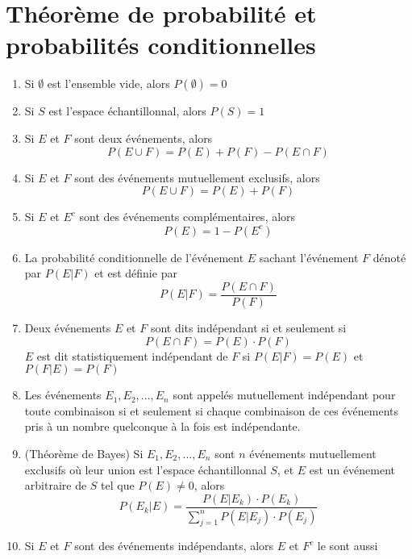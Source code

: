\section[Chapitre 2-3]{Théorème de probabilité et probabilités conditionnelles}
\begin{enumerate}
	\item Si $\emptyset$ est l'ensemble vide, alors $P(\emptyset)=0$
	\item Si $S$ est l'espace échantillonnal, alors $P(S)=1$
	\item Si $E$ et $F$ sont deux événements, alors
	\[P(E\cup F) = P(E) + P(F) - P(E\cap F)\]
	\item Si $E$ et $F$ sont des événements mutuellement exclusifs, alors
	\[P(E\cup F) = P(E) + P(F)\]
	\item Si $E$ et $E^c$ sont des événements complémentaires, alors
	\[P(E) = 1 - P(E^c)\]
	\item La probabilité conditionnelle de l'événement $E$ sachant l'événement $F$ dénoté par $P(E|F)$ et est définie par
	\[P(E|F)=\frac{P(E\cap F)}{P(F)}\]
	\item Deux événements $E$ et $F$ sont dits indépendant si et seulement si
	\[P(E\cap F)=P(E)\cdot P(F)\]
	$E$ est dit statistiquement indépendant de $F$ si $P(E|F)=P(E)$ et $P(F|E)=P(F)$
	\item Les événements $E_1,E_2,...,E_n$ sont appelés mutuellement indépendant pour toute combinaison si et seulement si chaque combinaison de ces événements pris à un nombre quelconque à la fois est indépendante.
	\item (Théorème de Bayes) Si $E_1,E_2,...,E_n$ sont $n$ événements mutuellement exclusifs où leur union est l'espace échantillonnal $S$, et $E$ est un événement arbitraire de $S$ tel que $P(E)\neq 0$, alors
	\[P(E_k|E)=\frac{P(E|E_k)\cdot P(E_k)}{\sum_{j=1}^{n}P(E|E_j)\cdot P(E_j)}\]
	\item Si $E$ et $F$ sont des événements indépendants, alors $E$ et $F^c$ le sont aussi	
\end{enumerate}